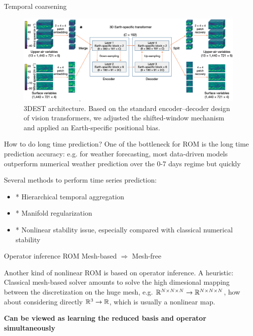 \documentclass{beamer}
\begin{document}
\begin{frame}{Temporal coarsening}
	\begin{figure}[ht]
		\centering
		\centerline{\includegraphics[width=\linewidth]{fig/pangu.png}}
		\caption{3DEST architecture.
		Based on the standard encoder–decoder design of vision transformers,
		we adjusted the shifted-window mechanism and applied an Earth-specific
		positional bias.\footnotemark}
\end{figure}
\end{frame}

\begin{frame}{How to do long time prediction?}
	One of the bottleneck for ROM is the long time prediction accuracy: e.g. for weather forecasting,
	most data-driven models outperform numerical weather prediction over the 0-7 days regime but
	quickly 

	Several methods to perform time series prediction:
	\begin{itemize}
		\item * Hierarchical temporal aggregation
		\item * Manifold regularization
		\item * Nonlinear stability issue, especially compared with classical numerical stability
	\end{itemize}
\end{frame}

\begin{frame}{Operator inference ROM}
	Mesh-based $\Longrightarrow$ Mesh-free

	Another kind of nonlinear ROM is based on operator inference. A heuristic:
	Classical mesh-based solver amounts to solve the high dimesional mapping between the discretization on
	the huge mesh, e.g. $\mathbb{R}^{N\times N\times N} \rightarrow \mathbb{R}^{N\times N\times N}$, how about considering directly
	$\mathbb{R}^3 \rightarrow \mathbb{R}$, which is usually a nonlinear map\footnotemark.

	\textbf{Can be viewed as learning the reduced basis and operator simultaneously}
\end{frame}
\end{document}
